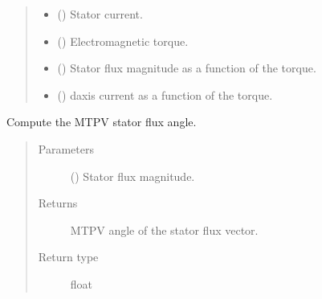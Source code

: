 \documentclass[letterpaper,10pt,english]{sphinxmanual}
\begin{document}
\begin{fulllineitems}
\begin{fulllineitems}
\begin{quote}
\begin{description}
\begin{itemize}
\item {} 
\sphinxAtStartPar
{} () \textendash{} Stator current.

\item {} 
\sphinxAtStartPar
{} () \textendash{} Electromagnetic torque.

\item {} 
\sphinxAtStartPar
{} () \textendash{} Stator flux magnitude as a function of the torque.

\item {} 
\sphinxAtStartPar
{} () \textendash{} d\sphinxhyphen{}axis current as a function of the torque.

\end{itemize}


\end{description}\end{quote}

\end{fulllineitems}


\begin{fulllineitems}
\label{\detokenize{control.sm:control.sm.torque.TorqueCharacteristics.mtpv}}
\pysigstartsignatures
{}
\pysigstopsignatures
\sphinxAtStartPar
Compute the MTPV stator flux angle.
\begin{quote}\begin{description}
\item[{Parameters}] \leavevmode
\sphinxAtStartPar
{} () \textendash{} Stator flux magnitude.

\item[{Returns}] \leavevmode
\sphinxAtStartPar
{} \textendash{} MTPV angle of the stator flux vector.

\item[{Return type}] \leavevmode
\sphinxAtStartPar
float

\end{description}\end{quote}


\end{fulllineitems}
\end{fulllineitems}
\end{document}

